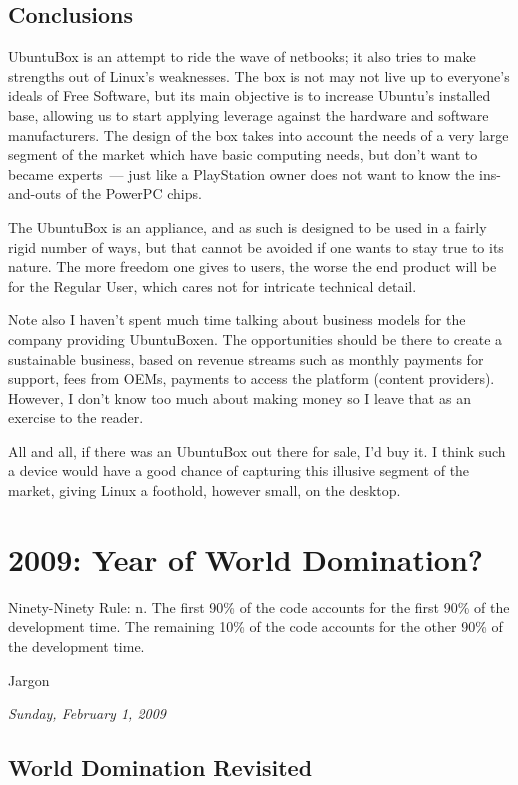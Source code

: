 \documentclass{book}
\begin{document}
\section{Conclusions}

UbuntuBox is an attempt to ride the wave of netbooks; it also tries to
make strengths out of Linux's weaknesses. The box is not may not live
up to everyone's ideals of Free Software, but its main objective is to
increase Ubuntu's installed base, allowing us to start applying
leverage against the hardware and software manufacturers. The design
of the box takes into account the needs of a very large segment of the
market which have basic computing needs, but don't want to became
experts~--- just like a PlayStation owner does not want to know the
ins-and-outs of the PowerPC chips.

The UbuntuBox is an appliance, and as such is designed to be used in a
fairly rigid number of ways, but that cannot be avoided if one wants
to stay true to its nature. The more freedom one gives to users, the
worse the end product will be for the Regular User, which cares not
for intricate technical detail.

Note also I haven't spent much time talking about business models for
the company providing UbuntuBoxen. The opportunities should be there
to create a sustainable business, based on revenue streams such as
monthly payments for support, fees from OEMs, payments to access the
platform (content providers). However, I don't know too much about
making money so I leave that as an exercise to the reader.

All and all, if there was an UbuntuBox out there for sale, I'd buy
it. I think such a device would have a good chance of capturing this
illusive segment of the market, giving Linux a foothold, however
small, on the desktop.

\chapter{2009: Year of World Domination?}

\epigraph{Ninety-Ninety Rule: n. The first 90\% of the code accounts for
  the first 90\% of the development time. The remaining 10\% of the
  code accounts for the other 90\% of the development time.}{Jargon}

\begin{flushright}
  \emph{Sunday, February 1, 2009}
\end{flushright}

\section{World Domination Revisited}
\end{document}
